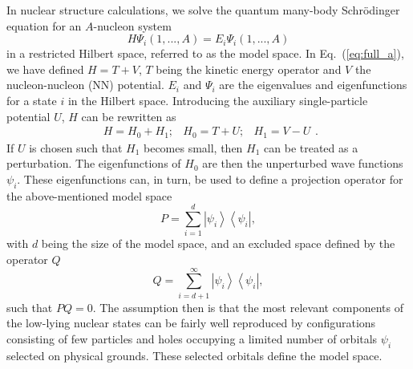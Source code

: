 In nuclear structure calculations, we solve the quantum
many-body Schr\"{o}dinger equation for an $A$-nucleon system
\begin{equation}
     H\Psi_i(1,...,A)=E_i\Psi_i(1,...,A)
     \label{eq:full_a}
\end{equation}
in a restricted Hilbert space, referred to as the model space.
In Eq.\ (\ref{eq:full_a}), we have defined
$H=T+V$,
$T$ being the kinetic energy operator and $V$ the nucleon-nucleon (NN)
potential.
$E_i$ and $\Psi_i$ are the eigenvalues and eigenfunctions
for a state $i$ in the Hilbert space.
Introducing the auxiliary single-particle potential $U$, $H$ can
be rewritten as
\begin{equation}
    \begin{array}{ccc}H=H_{0}+H_1;&H_{0}=T+U;&H_1=V-U\end{array}.
\end{equation}
If $U$ is chosen such that $H_1$ becomes small, then $H_1$
can be treated as a perturbation.
The eigenfunctions of $H_{0}$
are then the unperturbed wave functions $\psi_i$.
These eigenfunctions can, in turn, be used to define a projection 
operator for the above-mentioned model space     
\begin{equation}
     P=\sum_{i=1}^{d}\left | \psi_i\right\rangle 
     \left\langle\psi_i\right | ,
\end{equation}
with $d$ being the size of the model space, and an excluded space
defined by the operator $Q$
\begin{equation}
     Q=\sum_{i=d+1}^{\infty}\left | \psi_i\right\rangle 
     \left\langle\psi_i\right | ,
\end{equation}
such that $PQ=0$.
The assumption then is that the most relevant components of the low-lying
nuclear states can be fairly well reproduced by configurations consisting
of few particles and holes occupying a limited number of orbitals $\psi_{i}$
selected on physical grounds.
These selected orbitals define the model space.

